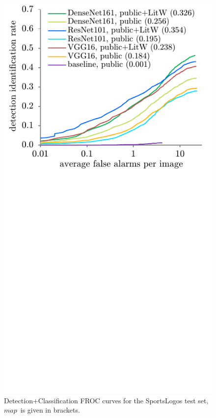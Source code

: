 \documentclass[a4paper,twoside]{article}
\newcommand{\map}{$\mathit{map}$}
\begin{document}
\begin{figure}%
\centering%
\includegraphics[width=\linewidth, trim=0cm 8.5cm 0cm 0cm, clip]{img/classificationFrocFootball.pdf}%
\caption{Detection+Classification FROC curves for the Sports\-Logos test set, \map~is given in brackets.}%
\label{fig:classificationFrocFootball}
\end{figure}%
%



\vfill

{\small
}

\vfill
\end{document}
